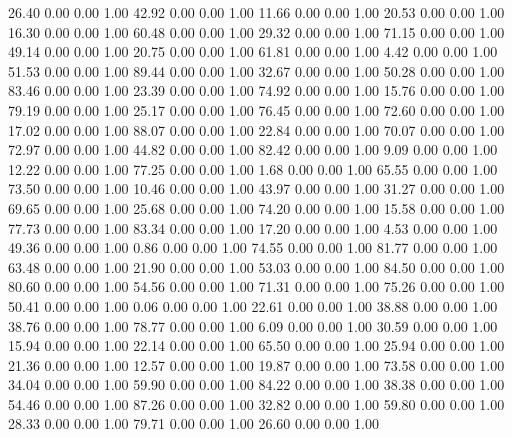    26.40   0.00   0.00   1.00
   42.92   0.00   0.00   1.00
   11.66   0.00   0.00   1.00
   20.53   0.00   0.00   1.00
   16.30   0.00   0.00   1.00
   60.48   0.00   0.00   1.00
   29.32   0.00   0.00   1.00
   71.15   0.00   0.00   1.00
   49.14   0.00   0.00   1.00
   20.75   0.00   0.00   1.00
   61.81   0.00   0.00   1.00
    4.42   0.00   0.00   1.00
   51.53   0.00   0.00   1.00
   89.44   0.00   0.00   1.00
   32.67   0.00   0.00   1.00
   50.28   0.00   0.00   1.00
   83.46   0.00   0.00   1.00
   23.39   0.00   0.00   1.00
   74.92   0.00   0.00   1.00
   15.76   0.00   0.00   1.00
   79.19   0.00   0.00   1.00
   25.17   0.00   0.00   1.00
   76.45   0.00   0.00   1.00
   72.60   0.00   0.00   1.00
   17.02   0.00   0.00   1.00
   88.07   0.00   0.00   1.00
   22.84   0.00   0.00   1.00
   70.07   0.00   0.00   1.00
   72.97   0.00   0.00   1.00
   44.82   0.00   0.00   1.00
   82.42   0.00   0.00   1.00
    9.09   0.00   0.00   1.00
   12.22   0.00   0.00   1.00
   77.25   0.00   0.00   1.00
    1.68   0.00   0.00   1.00
   65.55   0.00   0.00   1.00
   73.50   0.00   0.00   1.00
   10.46   0.00   0.00   1.00
   43.97   0.00   0.00   1.00
   31.27   0.00   0.00   1.00
   69.65   0.00   0.00   1.00
   25.68   0.00   0.00   1.00
   74.20   0.00   0.00   1.00
   15.58   0.00   0.00   1.00
   77.73   0.00   0.00   1.00
   83.34   0.00   0.00   1.00
   17.20   0.00   0.00   1.00
    4.53   0.00   0.00   1.00
   49.36   0.00   0.00   1.00
    0.86   0.00   0.00   1.00
   74.55   0.00   0.00   1.00
   81.77   0.00   0.00   1.00
   63.48   0.00   0.00   1.00
   21.90   0.00   0.00   1.00
   53.03   0.00   0.00   1.00
   84.50   0.00   0.00   1.00
   80.60   0.00   0.00   1.00
   54.56   0.00   0.00   1.00
   71.31   0.00   0.00   1.00
   75.26   0.00   0.00   1.00
   50.41   0.00   0.00   1.00
    0.06   0.00   0.00   1.00
   22.61   0.00   0.00   1.00
   38.88   0.00   0.00   1.00
   38.76   0.00   0.00   1.00
   78.77   0.00   0.00   1.00
    6.09   0.00   0.00   1.00
   30.59   0.00   0.00   1.00
   15.94   0.00   0.00   1.00
   22.14   0.00   0.00   1.00
   65.50   0.00   0.00   1.00
   25.94   0.00   0.00   1.00
   21.36   0.00   0.00   1.00
   12.57   0.00   0.00   1.00
   19.87   0.00   0.00   1.00
   73.58   0.00   0.00   1.00
   34.04   0.00   0.00   1.00
   59.90   0.00   0.00   1.00
   84.22   0.00   0.00   1.00
   38.38   0.00   0.00   1.00
   54.46   0.00   0.00   1.00
   87.26   0.00   0.00   1.00
   32.82   0.00   0.00   1.00
   59.80   0.00   0.00   1.00
   28.33   0.00   0.00   1.00
   79.71   0.00   0.00   1.00
   26.60   0.00   0.00   1.00

